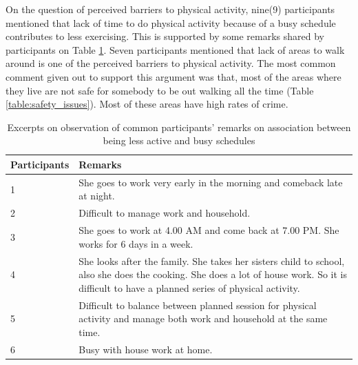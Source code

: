 On the question of perceived barriers to physical activity, nine(9) participants mentioned that lack of time to do physical activity because of a busy schedule contributes to less exercising. This is supported by some remarks shared by participants on Table \ref{table:busy_schedules}. Seven participants mentioned that lack of areas to walk around is one of the perceived barriers to physical activity. The most common comment given out to support this argument was that, most of the areas where they live are not safe for somebody to be out walking all the time (Table \ref{table:safety_issues}). Most of these areas have high rates of crime.

\begin{table}[h!]
\begin{center}
    \caption{Excerpts on observation of common participants’ remarks on association between being less active and busy schedules}
    \label{table:busy_schedules}
	\begin{tabular}{|p{2.5cm}|p{10.5cm}|}
		\hline
		 \textbf{Participants}&\textbf{Remarks}\\
	  \hline
	  1&She goes to work very early in the morning and comeback late at night.\\
	  \hline
	  2&Difficult to manage work and household.\\
	  \hline
	  3&She goes to work at 4.00 AM and come back at 7.00 PM. She works for 6 days in a week.\\
	  \hline
	  4&She looks after the family. She takes her sisters child to school, also she does the cooking. She does a lot of house work. So it is difficult to have a planned series of physical activity.\\
	  \hline
	 5&Difficult to balance between planned session for physical activity and manage both work and household at the same time.\\
	 \hline
	 6&Busy with house work at home.\\
	 \hline
	\end{tabular}
  \end{center}
\end{table}

